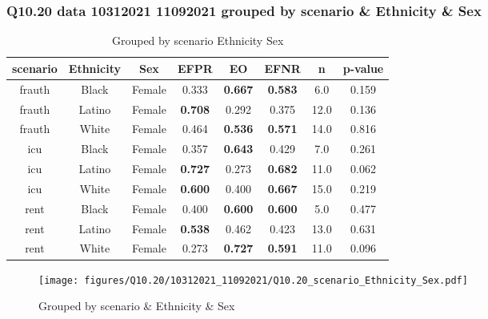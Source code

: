 \subsubsection{Q10.20 data 10312021 11092021 grouped by scenario \& Ethnicity \& Sex}

\begin{comment}
                              EFPR        EO      EFNR     n    pvalue
(frauth, Black, Female)   0.333333  0.666667  0.583333   6.0  0.159011
(frauth, Latino, Female)  0.708333  0.291667  0.375000  12.0  0.136180
(frauth, White, Female)   0.464286  0.535714  0.571429  14.0  0.815854
(icu, Black, Female)      0.357143  0.642857  0.428571   7.0  0.260534
(icu, Latino, Female)     0.727273  0.272727  0.681818  11.0  0.061697
(icu, White, Female)      0.600000  0.400000  0.666667  15.0  0.218703
(rent, Black, Female)     0.400000  0.600000  0.600000   5.0  0.477289
(rent, Latino, Female)    0.538462  0.461538  0.423077  13.0  0.630760
(rent, White, Female)     0.272727  0.727273  0.590909  11.0  0.096448
\end{comment}

\begin{table}[h]
    \centering
    \begin{tabular}{|c|c|c|c|c|c|c|c|}
        \hline
        scenario & Ethnicity & Sex & EFPR & EO & EFNR & n & p-value\\
        \hline
        frauth & Black & Female & 0.333 & \textbf{0.667} & \textbf{0.583} & 6.0 & 0.159\\
		frauth & Latino & Female & \textbf{0.708} & 0.292 & 0.375 & 12.0 & 0.136\\
		frauth & White & Female & 0.464 & \textbf{0.536} & \textbf{0.571} & 14.0 & 0.816\\
		icu & Black & Female & 0.357 & \textbf{0.643} & 0.429 & 7.0 & 0.261\\
		icu & Latino & Female & \textbf{0.727} & 0.273 & \textbf{0.682} & 11.0 & 0.062\\
		icu & White & Female & \textbf{0.600} & 0.400 & \textbf{0.667} & 15.0 & 0.219\\
		rent & Black & Female & 0.400 & \textbf{0.600} & \textbf{0.600} & 5.0 & 0.477\\
		rent & Latino & Female & \textbf{0.538} & 0.462 & 0.423 & 13.0 & 0.631\\
		rent & White & Female & 0.273 & \textbf{0.727} & \textbf{0.591} & 11.0 & 0.096\\
		
        \hline
    \end{tabular}
    \caption{Grouped by scenario Ethnicity Sex}
    \label{tab:my_label}
\end{table}
\begin{figure}[h]
    \centering
    \texttt{[image: figures/Q10.20/10312021\_11092021/Q10.20\_scenario\_Ethnicity\_Sex.pdf]}
    \caption{Grouped by scenario \& Ethnicity \& Sex}
    \label{fig:my_label}
\end{figure}
